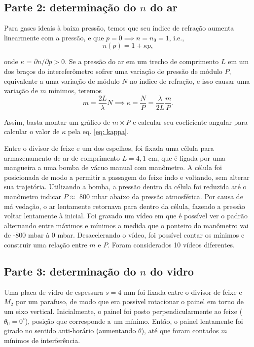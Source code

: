 \subsection*{Parte 2: determinação do $n$ do ar} 
Para gases ideais à baixa pressão, temos que seu índice de refração aumenta linearmente com a pressão, e que $p = 0 \implies n = n_0 = 1$, i.e., 
\begin{equation}\label{eq: n(p)}
	n(p) = 1 + \kappa p,
\end{equation}

\noindent onde $\kappa = \partial n / \partial p > 0$. Se a pressão do ar em um trecho de comprimento $L$ em um dos braços do intereferômetro sofrer uma variação de pressão de módulo $P$, equivalente a uma variação de módulo $N$ no índice de refração, e isso causar uma variação de $m$ mínimos, teremos 
\begin{equation}\label{eq: kappa}
	m = \frac{2L}{\lambda} N 
	\implies \kappa = \frac{N}{P} = \frac{\lambda}{2L} \frac{m}{P}.
\end{equation}

\noindent Assim, basta montar um gráfico de $m \times P$ e calcular seu coeficiente angular para calcular o valor de $\kappa$ pela eq. \eqref{eq: kappa}. 

Entre o divisor de feixe e um dos espelhos, foi fixada uma célula para armazenamento de ar de comprimento $L=4,1$ cm, que é ligada por uma mangueira a uma bomba de vácuo manual com manômetro. 
A célula foi posicionada de modo a permitir a passagem do feixe indo e voltando, sem alterar sua trajetória. 
Utilizando a bomba, a pressão dentro da célula foi reduzida até o manômetro indicar $ P \approx $ 800 mbar abaixo da pressão atmosférica. Por causa de má vedação, o ar lentamente retornava para dentro da célula, fazendo a pressão voltar lentamente à inicial. Foi gravado um vídeo em que é possível ver o padrão alternando entre máximos e mínimos a medida que o ponteiro do manômetro vai de -800 mbar à 0 mbar. Desacelerando o vídeo, foi possível contar os mínimos e construir uma relação entre $m$ e $P$. Foram considerados 10 vídeos diferentes.

\subsection*{Parte 3: determinação do $n$ do vidro}
Uma placa de vidro de espessura $s = 4$ mm foi fixada entre o divisor de feixe e $M_2$ por um parafuso, de modo que era possível rotacionar o painel em torno de um eixo vertical. 
Inicialmente, o painel foi posto perpendicularmente ao feixe ($\theta_0 = 0^\circ$), posição que corresponde a um mínimo.
Então, o painel lentamente foi girado no sentido anti-horário (aumentando $\theta$), até que foram contados $m$ mínimos de interferência. 

